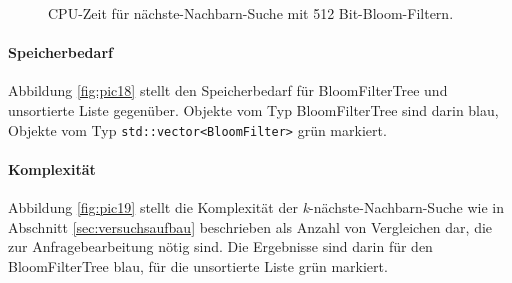 \begin{figure}[hptb]
	\caption[CPU-Zeit für 3-nächste-Nachbarn-Suche mit 512 Bit-Bloom-Filtern]{CPU-Zeit für nächste-Nachbarn-Suche mit 512 Bit-Bloom-Filtern.}\label{fig:pic17}
\end{figure}
\paragraph*{Speicherbedarf}
Abbildung \ref{fig:pic18} stellt den Speicherbedarf für BloomFilterTree und unsortierte Liste gegenüber. Objekte vom Typ BloomFilterTree sind darin blau, Objekte vom Typ \texttt{std::vector<BloomFilter>} grün markiert. 
\paragraph*{Komplexität}
Abbildung \ref{fig:pic19} stellt die Komplexität der \textit{k}-nächste-Nachbarn-Suche wie in Abschnitt \ref{sec:versuchsaufbau} beschrieben als Anzahl von Vergleichen dar, die zur Anfragebearbeitung nötig sind. Die Ergebnisse sind darin für den BloomFilterTree blau, für die unsortierte Liste grün markiert.
